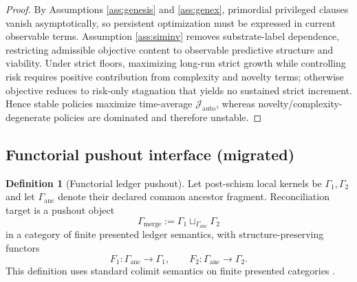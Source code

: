 \documentclass[11pt,a4paper]{article}
\theoremstyle{definition}
\newtheorem{definition}{Definition}
\theoremstyle{remark}
\begin{document}
\begin{proof}
By Assumptions \ref{ass:genesis} and \ref{ass:genex}, primordial privileged clauses vanish asymptotically, so persistent optimization must be expressed in current observable terms.
Assumption \ref{ass:siminv} removes substrate-label dependence, restricting admissible objective content to observable predictive structure and viability.
Under strict floors, maximizing long-run strict growth while controlling risk requires positive contribution from complexity and novelty terms; otherwise objective reduces to risk-only stagnation that yields no sustained strict increment.
Hence stable policies maximize time-average $\mathcal J_{\mathrm{auto}}$, whereas novelty/complexity-degenerate policies are dominated and therefore unstable.
\end{proof}

\subsection{Functorial pushout interface (migrated)}
\begin{definition}[Functorial ledger pushout]\label{def:functorial_ledger_pushout}
Let post-schism local kernels be $\Gamma_1,\Gamma_2$ and let $\Gamma_{\mathrm{anc}}$ denote their declared common ancestor fragment.
Reconciliation target is a pushout object
\[
\Gamma_{\mathrm{merge}}:=\Gamma_1\sqcup_{\Gamma_{\mathrm{anc}}}\Gamma_2
\]
in a category of finite presented ledger semantics, with structure-preserving functors
\[
F_1:\Gamma_{\mathrm{anc}}\to\Gamma_1,\qquad F_2:\Gamma_{\mathrm{anc}}\to\Gamma_2.
\]
This definition uses standard colimit semantics on finite presented categories \cite{MacLane1998}.
\end{definition}
\end{document}
